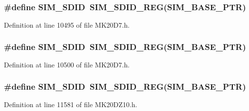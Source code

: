 \subsubsection[{\texorpdfstring{S\+I\+M\+\_\+\+S\+D\+ID}{SIM_SDID}}]{\setlength{\rightskip}{0pt plus 5cm}\#define S\+I\+M\+\_\+\+S\+D\+ID~{\bf S\+I\+M\+\_\+\+S\+D\+I\+D\+\_\+\+R\+EG}({\bf S\+I\+M\+\_\+\+B\+A\+S\+E\+\_\+\+P\+TR})}\hypertarget{group___s_i_m___register___accessor___macros_ga3bdd59b25543acf9b3d301093344004f}{}\label{group___s_i_m___register___accessor___macros_ga3bdd59b25543acf9b3d301093344004f}


Definition at line 10495 of file M\+K20\+D7.\+h.

\subsubsection[{\texorpdfstring{S\+I\+M\+\_\+\+S\+D\+ID}{SIM_SDID}}]{\setlength{\rightskip}{0pt plus 5cm}\#define S\+I\+M\+\_\+\+S\+D\+ID~{\bf S\+I\+M\+\_\+\+S\+D\+I\+D\+\_\+\+R\+EG}({\bf S\+I\+M\+\_\+\+B\+A\+S\+E\+\_\+\+P\+TR})}\hypertarget{group___s_i_m___register___accessor___macros_ga3bdd59b25543acf9b3d301093344004f}{}\label{group___s_i_m___register___accessor___macros_ga3bdd59b25543acf9b3d301093344004f}


Definition at line 10500 of file M\+K20\+D7.\+h.

\subsubsection[{\texorpdfstring{S\+I\+M\+\_\+\+S\+D\+ID}{SIM_SDID}}]{\setlength{\rightskip}{0pt plus 5cm}\#define S\+I\+M\+\_\+\+S\+D\+ID~{\bf S\+I\+M\+\_\+\+S\+D\+I\+D\+\_\+\+R\+EG}({\bf S\+I\+M\+\_\+\+B\+A\+S\+E\+\_\+\+P\+TR})}\hypertarget{group___s_i_m___register___accessor___macros_ga3bdd59b25543acf9b3d301093344004f}{}\label{group___s_i_m___register___accessor___macros_ga3bdd59b25543acf9b3d301093344004f}


Definition at line 11581 of file M\+K20\+D\+Z10.\+h.

